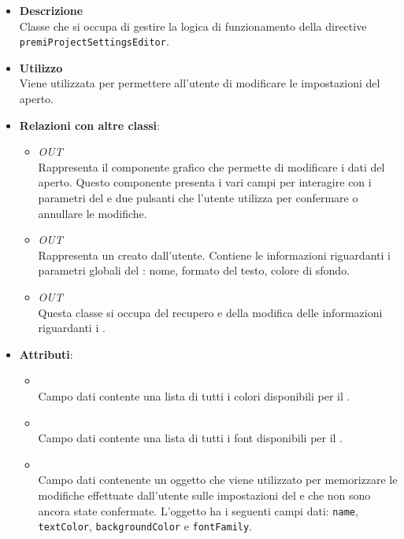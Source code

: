 \begin{itemize}
\item \textbf{Descrizione}\\
Classe che si occupa di gestire la logica di funzionamento della directive \texttt{premiProjectSettingsEditor}.
\item \textbf{Utilizzo}\\
Viene utilizzata per permettere all'utente di modificare le impostazioni del  aperto.
\item \textbf{Relazioni con altre classi}:
\begin{itemize}
\item \textit{OUT} \hyperref[\nogloxy{Premi::Front-End::Directives::premiProjectSettingsEditor}]{}\\
Rappresenta il componente grafico che permette di modificare i dati del  aperto.
Questo componente presenta i vari campi per interagire con i parametri del  e due pulsanti che l'utente utilizza per confermare o annullare le modifiche.
\item \textit{OUT} \hyperref[\nogloxy{Premi::Front-End::Model::Project}]{}\\
Rappresenta un  creato dall’utente. Contiene le informazioni riguardanti i parametri globali del : nome, formato del testo, colore di sfondo.
\item \textit{OUT} \hyperref[\nogloxy{Premi::Front-End::Services::ProjectService}]{}\\
Questa classe si occupa del recupero e della modifica delle informazioni riguardanti i .
\end{itemize}
\item \textbf{Attributi}:
\begin{itemize}
\item {}
\\ Campo dati contente una lista di tutti i colori disponibili per il .
\item {}
\\ Campo dati contente una lista di tutti i font disponibili per il .
\item {}
\\ Campo dati contenente un oggetto che viene utilizzato per memorizzare le modifiche effettuate dall'utente sulle impostazioni del  e che non sono ancora state confermate. L'oggetto ha i seguenti campi dati: \texttt{name}, \texttt{textColor}, \texttt{backgroundColor} e \texttt{fontFamily}.

\end{itemize}
\end{itemize}
